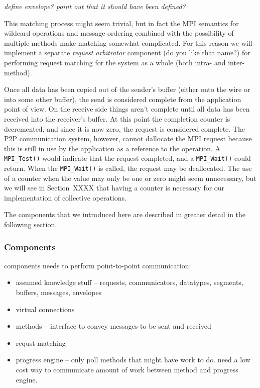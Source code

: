 \emph{define envelope?  point out that it should have been defined?}

This matching process might seem trivial, but in fact the MPI semantics for
wildcard operations and message ordering combined with the possibility of
multiple methods make matching somewhat complicated.
For this reason we will implement a separate \emph{request arbitrator}
component (do you like that name?) for performing request matching for the
system as a whole (both intra- and inter-method).

% 

Once all data has been copied out of the sender's buffer (either onto the wire
or into some other buffer), the send is considered complete from the
application point of view.  On the receive side things aren't complete until
all data has been received into the receiver's buffer.  
%
At this point the completion counter is decremented, and since it is now zero,
the request is considered complete.  The P2P communication system, however,
cannot dallocate the MPI request because this is still in use by the
application as a reference to the operation.
%
A \texttt{MPI\_Test()} would indicate that
the request completed, and a \texttt{MPI\_Wait()} could return.
%
When the \texttt{MPI\_Wait()} is called, the request may be deallocated.
%
The use of a counter when the value may only be one or zero might seem
unnecessary, but we will see in Section~XXXX that having a counter is
necessary for our implementation of collective operations.

The components that we introduced here are described in greater detail in the
following section.

\subsubsection{Components}

components needs to perform point-to-point communication:
\begin{itemize}
\item assumed knowledge stuff -- requests, communicators, datatypes, segments, buffers, messages, envelopes
\item virtual connections
\item methods --
interface to convey messages to be sent and received
\item requst matching
\item progress engine --
only poll methods that might have work to do.  need a low cost way to
communicate amount of work between method and progress engine.
\end{itemize}

